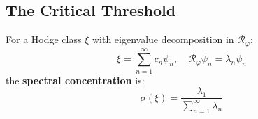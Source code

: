 \subsection{The Critical Threshold}

\begin{defn}\label{def:spectral-concentration}
For a Hodge class $\xi$ with eigenvalue decomposition in $\mathcal{R}_\varphi$:
\begin{equation}
\xi = \sum_{n=1}^{\infty} c_n \psi_n, \quad \mathcal{R}_\varphi \psi_n = \lambda_n \psi_n
\end{equation}
the \textbf{spectral concentration} is:
\begin{equation}
\sigma(\xi) = \frac{\lambda_1}{\sum_{n=1}^{\infty} \lambda_n}
\end{equation}
\end{defn}


